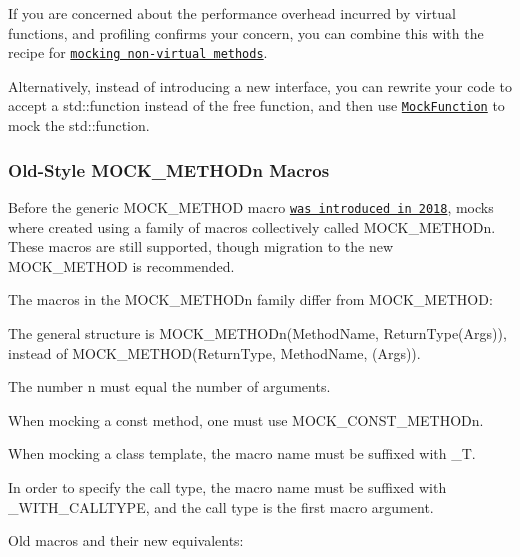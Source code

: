 If you are concerned about the performance overhead incurred by virtual functions, and profiling confirms your concern, you can combine this with the recipe for \href{#MockingNonVirtualMethods}{\tt mocking non-\/virtual methods}.

Alternatively, instead of introducing a new interface, you can rewrite your code to accept a std\+::function instead of the free function, and then use \href{#MockFunction}{\tt Mock\+Function} to mock the std\+::function.

\subsubsection*{Old-\/\+Style {\ttfamily M\+O\+C\+K\+\_\+\+M\+E\+T\+H\+O\+Dn} Macros}

Before the generic {\ttfamily M\+O\+C\+K\+\_\+\+M\+E\+T\+H\+OD} macro \href{https://github.com/google/googletest/commit/c5f08bf91944ce1b19bcf414fa1760e69d20afc2}{\tt was introduced in 2018}, mocks where created using a family of macros collectively called {\ttfamily M\+O\+C\+K\+\_\+\+M\+E\+T\+H\+O\+Dn}. These macros are still supported, though migration to the new {\ttfamily M\+O\+C\+K\+\_\+\+M\+E\+T\+H\+OD} is recommended.

The macros in the {\ttfamily M\+O\+C\+K\+\_\+\+M\+E\+T\+H\+O\+Dn} family differ from {\ttfamily M\+O\+C\+K\+\_\+\+M\+E\+T\+H\+OD}\+:


\begin{DoxyItemize}
\item The general structure is {\ttfamily M\+O\+C\+K\+\_\+\+M\+E\+T\+H\+O\+Dn(\+Method\+Name, Return\+Type(\+Args))}, instead of {\ttfamily M\+O\+C\+K\+\_\+\+M\+E\+T\+H\+O\+D(\+Return\+Type, Method\+Name, (\+Args))}.
\item The number {\ttfamily n} must equal the number of arguments.
\item When mocking a const method, one must use {\ttfamily M\+O\+C\+K\+\_\+\+C\+O\+N\+S\+T\+\_\+\+M\+E\+T\+H\+O\+Dn}.
\item When mocking a class template, the macro name must be suffixed with {\ttfamily \+\_\+T}.
\item In order to specify the call type, the macro name must be suffixed with {\ttfamily \+\_\+\+W\+I\+T\+H\+\_\+\+C\+A\+L\+L\+T\+Y\+PE}, and the call type is the first macro argument.
\end{DoxyItemize}

Old macros and their new equivalents\+:

